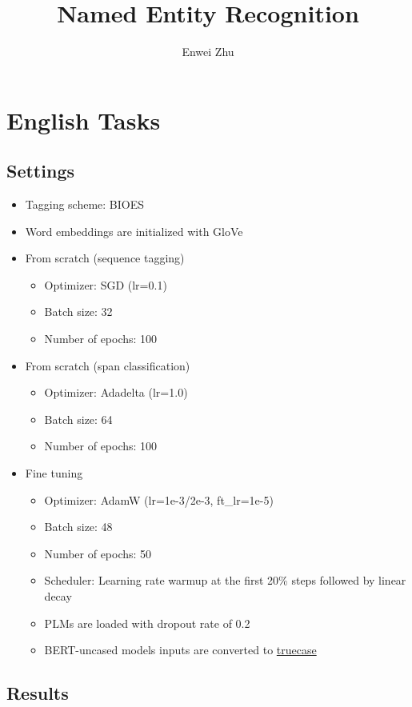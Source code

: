 \documentclass{article}
\title{Named Entity Recognition}
\author{Enwei Zhu}
\begin{document}
\maketitle

\section{English Tasks}
\subsection{Settings}
\begin{itemize}
    \item Tagging scheme: BIOES
    \item Word embeddings are initialized with GloVe
    \item From scratch (sequence tagging)
    \begin{itemize}
        \item Optimizer: SGD (lr=0.1)
        \item Batch size: 32
        \item Number of epochs: 100
    \end{itemize}
    \item From scratch (span classification)
    \begin{itemize}
        \item Optimizer: Adadelta (lr=1.0)
        \item Batch size: 64
        \item Number of epochs: 100
    \end{itemize}
    \item Fine tuning 
    \begin{itemize}
        \item Optimizer: AdamW (lr=1e-3/2e-3, ft\_lr=1e-5)
        \item Batch size: 48
        \item Number of epochs: 50
        \item Scheduler: Learning rate warmup at the first 20\% steps followed by linear decay
        \item PLMs are loaded with dropout rate of 0.2
        \item BERT-uncased models inputs are converted to \href{https://github.com/daltonfury42/truecase}{truecase}
    \end{itemize}
\end{itemize}

\subsection{Results}
\end{document}
